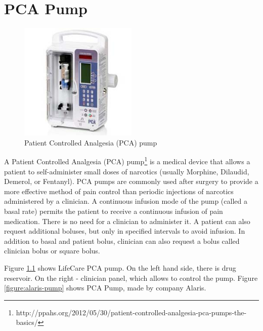 
\cleardoublepage


\chapter{PCA Pump}
\label{pcapump}


\begin{figure}
  \begin{center}
    \includegraphics[width=0.5\textwidth]{figures/pca-pump.png}
  \end{center}
  \caption{Patient Controlled Analgesia (PCA) pump}
  \label{figure:pca-pump}
\end{figure}

A Patient Controlled Analgesia (PCA) pump\footnote{http://ppahs.org/2012/05/30/patient-controlled-analgesia-pca-pumps-the-basics/} is a medical device that allows a patient to self-administer small doses of narcotics (usually Morphine, Dilaudid, Demerol, or Fentanyl). PCA pumps are commonly used after surgery to provide a more effective method of pain control than periodic injections of narcotics administered by a clinician. A continuous infusion mode of the pump (called a basal rate) permits the patient to receive a continuous infusion of pain medication. There is no need for a clinician to administer it. A patient can also request additional boluses, but only in specified intervals to avoid infusion. In addition to basal and patient bolus, clinician can also request a bolus called clinician bolus or square bolus. 

Figure \ref{figure:pca-pump} shows LifeCare PCA pump. On the left hand side, there is drug reservoir. On the right -  clinician panel, which allows to control the pump. Figure \ref{figure:alaris-pump} shows PCA Pump, made by company Alaris. 

